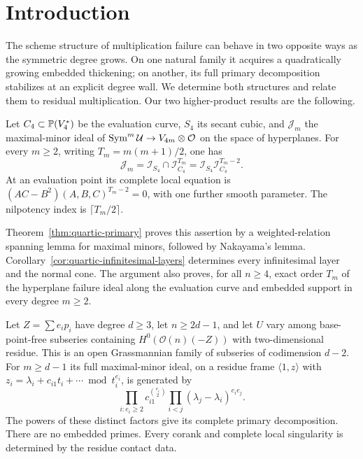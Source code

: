 \section{Introduction}
\label{sec:introduction}
The scheme structure of multiplication failure can behave in two
opposite ways as the symmetric degree grows. On one natural family
it acquires a quadratically growing embedded thickening; on another,
its full primary decomposition stabilizes at an explicit degree wall.
We determine both structures and relate them to residual multiplication.
Our two higher-product results are the following.

\begin{theorem}\label{thm:quartic-intro}
Let $C_4\subset\mathbb P(V_4^*)$ be the evaluation curve, $S_4$ its
secant cubic, and $\mathcal J_m$ the maximal-minor ideal of
$\operatorname{Sym}^m\mathcal U\to V_{4m}\otimes\mathcal O$ on the space of
hyperplanes. For every $m\ge2$, writing $T_m=m(m+1)/2$, one has
\[
 \mathcal J_m=\mathcal I_{S_4}\cap\mathcal I_{C_4}^{T_m}
            =\mathcal I_{S_4}\mathcal I_{C_4}^{T_m-2}.
\]
At an evaluation point its complete local equation is
$(AC-B^2)(A,B,C)^{T_m-2}=0$, with one further smooth parameter.
The nilpotency index is $\lceil T_m/2\rceil$.
\end{theorem}

Theorem~\ref{thm:quartic-primary} proves this assertion by a
weighted-relation spanning lemma for maximal minors, followed by
Nakayama's lemma. Corollary~\ref{cor:quartic-infinitesimal-layers}
determines every infinitesimal layer and the normal cone. The
argument also proves, for all $n\ge4$, exact order $T_m$ of the
hyperplane failure ideal along the evaluation curve and embedded
support in every degree $m\ge2$.

\begin{theorem}\label{thm:contact-intro}
Let $Z=\sum e_i p_i$ have degree $d\ge3$, let $n\ge2d-1$, and
let $U$ vary among base-point-free subseries containing
$H^0(\mathcal O(n)(-Z))$ with two-dimensional residue. This is an
open Grassmannian family of subseries of codimension $d-2$.
For $m\ge d-1$ its full maximal-minor ideal, on a residue frame
$\langle1,z\rangle$ with
$z_i=\lambda_i+c_{i1}t_i+\cdots\bmod t_i^{e_i}$, is generated by
\[
 \prod_{i:e_i\ge2}c_{i1}^{\binom{e_i}{2}}
 \prod_{i<j}(\lambda_j-\lambda_i)^{e_i e_j}.
\]
The powers of these distinct factors give its complete primary
decomposition. There are no embedded primes. Every corank and
complete local singularity is determined by the residue contact data.
\end{theorem}

